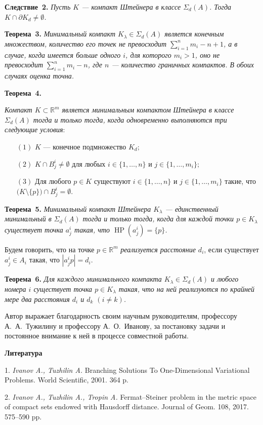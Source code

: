 \textbf{Следствие~2.} {\it Пусть $K$ --- компакт Штейнера в классе $\Sigma_d(A)$. Тогда $K\cap \partial K_d\neq \emptyset$.}

\textbf{Теорема~3.} {\it Минимальный компакт $K_\lambda \in \Sigma_d(A)$ является конечным множеством, количество его точек не превосходит $\sum_{i=1}^n m_i - n + 1$, а в случае, когда имеется больше одного $i$, для которого $m_i > 1$, оно не превосходит $\sum_{i=1}^n m_i - n$, где $n$ --- количество граничных компактов. В обоих случаях оценка точна.}

\textbf{Теорема~4.} {\it Компакт $K \subset {\mathbb R^m}$ является минимальным компактом Штейнера в классе $\Sigma_d(A)$ тогда и только тогда, когда одновременно выполняются три следующие условия$:$
	\begin{itemize}
		\item[$(1)$] $K$ --- конечное подмножество $K_d;$
		\item[$(2)$] $K\cap B_j^i\neq \emptyset$ для любых $i\in \{1,\ldots,n\}$ и $j\in \{1,\ldots,m_i\};$
		\item[$(3)$] Для любого $p \in K$ существуют $i\in \{1,\ldots,n\}$ и $j\in \{1,\ldots,m_i\}$ такие, что $\bigl(K\setminus \{p\}\bigr)\cap B_j^i=\emptyset$.
\end{itemize}}

\textbf{Теорема~5.} {\it Минимальный компакт Штейнера $K_\lambda$ --- единственный минимальный в $\Sigma_d(A)$ тогда и только тогда, когда для каждой точки $p \in K_\lambda$ существует точка $a^i_j$ такая, что $\operatorname{HP}(a^i_j)=\{p\}$.}

Будем говорить, что на точке $p\in \mathbb R^m$ \emph{реализуется расстояние $d_i$}, если существует $a_j^i\in A_i$ такая, что $|a_j^ip|=d_i$.

\textbf{Теорема~6.} {\it Для каждого минимального компакта $K_\lambda \in \Sigma_d(A)$ и любого номера $i$ существует точка $p\in K_\lambda$ такая, что на ней реализуются по крайней мере два расстояния $d_i$ и $d_k$ $(i\neq k)$.}

Автор выражает благодарность своим научным руководителям, профессору А.~А.~Тужилину и профессору А.~О.~Иванову, за постановку задачи и постоянное внимание к ней в процессе совместной работы.



\smallskip \centerline {\bf Литература} \nopagebreak


1. {\it Ivanov A., Tuzhilin A.} Branching Solutions To One-Dimensional Variational Problems. World Scientific, 2001. 364 p.

2. {\it Ivanov A., Tuzhilin A., Tropin A.} Fermat–Steiner problem in the metric space of compact sets endowed with Hausdorff distance. Journal of Geom. 108, 2017. 575--590 pp.
